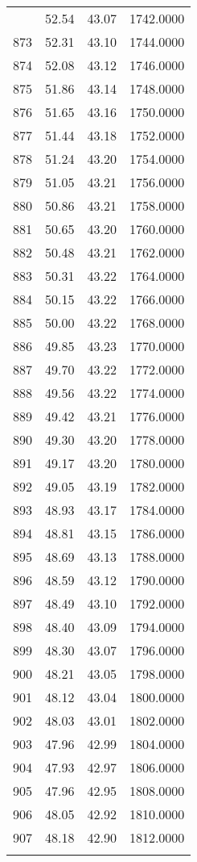 \documentclass[
  captions=tableheading,
]{scrartcl}
\begin{document}
\begin{longtable} {l|l|l|l}
{872 &	52.54 &	43.07 &	1742.0000\\
873 &	52.31 &	43.10 &	1744.0000\\
874 &	52.08 &	43.12 &	1746.0000\\
875 &	51.86 &	43.14 &	1748.0000\\
876 &	51.65 &	43.16 &	1750.0000\\
877 &	51.44 &	43.18 &	1752.0000\\
878 &	51.24 &	43.20 &	1754.0000\\
879 &	51.05 &	43.21 &	1756.0000\\
880 &	50.86 &	43.21 &	1758.0000\\
881 &	50.65 &	43.20 &	1760.0000\\
882 &	50.48 &	43.21 &	1762.0000\\
883 &	50.31 &	43.22 &	1764.0000\\
884 &	50.15 &	43.22 &	1766.0000\\
885 &	50.00 &	43.22 &	1768.0000\\
886 &	49.85 &	43.23 &	1770.0000\\
887 &	49.70 &	43.22 &	1772.0000\\
888 &	49.56 &	43.22 &	1774.0000\\
889 &	49.42 &	43.21 &	1776.0000\\
890 &	49.30 &	43.20 &	1778.0000\\
891 &	49.17 &	43.20 &	1780.0000\\
892 &	49.05 &	43.19 &	1782.0000\\
893 &	48.93 &	43.17 &	1784.0000\\
894 &	48.81 &	43.15 &	1786.0000\\
895 &	48.69 &	43.13 &	1788.0000\\
896 &	48.59 &	43.12 &	1790.0000\\
897 &	48.49 &	43.10 &	1792.0000\\
898 &	48.40 &	43.09 &	1794.0000\\
899 &	48.30 &	43.07 &	1796.0000\\
900 &	48.21 &	43.05 &	1798.0000\\
901 &	48.12 &	43.04 &	1800.0000\\
902 &	48.03 &	43.01 &	1802.0000\\
903 &	47.96 &	42.99 &	1804.0000\\
904 &	47.93 &	42.97 &	1806.0000\\
905 &	47.96 &	42.95 &	1808.0000\\
906 &	48.05 &	42.92 &	1810.0000\\
907 &	48.18 &	42.90 &	1812.0000\\
}
\end{longtable}
\end{document}
